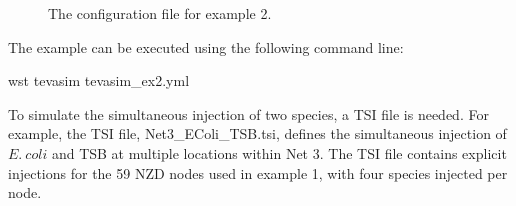 \begin{figure}[h]
  \caption{The  configuration file for example 2.}
  \label{fig:tevasim_ex2}
\end{figure}

The example can be executed using the following command line:

\begin{unknownListing}
wst tevasim tevasim_ex2.yml
\end{unknownListing}

To simulate the simultaneous injection of two species, a TSI file is needed. For example, the TSI file, 
Net3\_EColi\_TSB.tsi, defines the simultaneous injection of $E.~coli$ and TSB at multiple locations 
within Net 3. The TSI file contains explicit injections for the 59 NZD nodes used in example 1, with 
four species injected per node.
